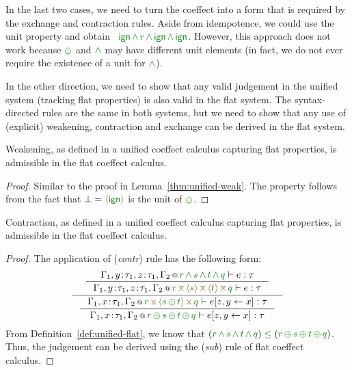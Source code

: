 \noindent
In the last two cases, we need to turn the coeffect into a form that is required by the exchange
and contraction rules. Aside from idempotence, we could use the unit property and obtain 
\eg~$\czero\,\czip\,\cclrd{r}\,\czip\,\czero\,\czip\,\czero$. However, this approach does not 
work because $\cpar$ and $\czip$ may have different unit elements (in fact, we do not ever require
the existence of a unit for $\czip$).

In the other direction, we need to show that any valid judgement in the unified system (tracking
flat properties) is also valid in the flat system. The syntax-directed rules are the same in both
systems, but we need to show that any use of (explicit) weakening, contraction and exchange can be
derived in the flat system. 

\begin{lemma}
Weakening, as defined in a unified coeffect calculus capturing flat properties, is admissible in 
the flat coeffect calculus.
\end{lemma}
\begin{proof}
Similar to the proof in Lemma~\ref{thm:unified-weak}. The property follows from the fact that 
$\bot=\alift{\czero}$ is the unit of $\cpar$.
\end{proof}

\begin{lemma}
\label{thm:unified-rev-contr}
Contraction, as defined in a unified coeffect calculus capturing flat properties, is admissible in 
the flat coeffect calculus.
\end{lemma}
\begin{proof}
The application of (\emph{contr}) rule has the following form:
\begin{equation*}
\inference
 { \inference
    {\coctx{\Gamma_1,y\!:\!\tau_1,z\!:\!\tau_1,\Gamma_2}{\cclrd{r} \,\czip\, \cclrd{s} \,\czip\, \cclrd{t} \,\czip\, \cclrd{q}} \vdash e : \tau}
    {\coctx{\Gamma_1,y\!:\!\tau_1,z\!:\!\tau_1,\Gamma_2}{\cclrd{r} \,\azip\, \alift{\cclrd{s}} \,\azip\, \alift{\cclrd{t}} \,\azip\, \cclrd{q}} \vdash e : \tau} }
 { \inference
    {\coctx{\Gamma_1,x\!:\!\tau_1,\Gamma_2}{\cclrd{r} \,\apar\, \alift{\cclrd{s} \,\cpar\, \cclrd{t}} \,\apar\, \cclrd{q}} \vdash \subst{e}{z,y}{x} : \tau}
    {\coctx{\Gamma_1,x\!:\!\tau_1,\Gamma_2}{\cclrd{r} \,\cpar\, \cclrd{s} \,\cpar\, \cclrd{t} \,\cpar\, \cclrd{q}} \vdash \subst{e}{z,y}{x} : \tau} } 
\end{equation*}
%
From Definition~\ref{def:unified-flat}, we know that $(\cclrd{r} \,\czip\, \cclrd{s} \,\czip\, \cclrd{t} \,\czip\, \cclrd{q}) 
\;\cleq\; (\cclrd{r} \,\cpar\, \cclrd{s} \,\cpar\, \cclrd{t} \,\cpar\, \cclrd{q})$. Thus, the judgement
 can be derived using the (\emph{sub}) rule of flat coeffect calculus.
\end{proof}


